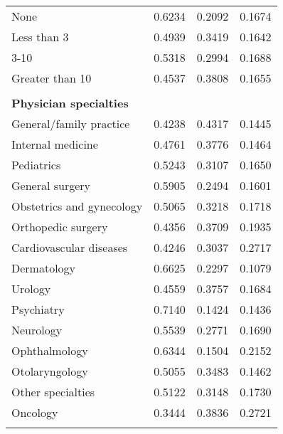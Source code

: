 \documentclass[11pt, oneside]{article}        %
\begin{document}
\begin{table}[h]
\begin{tabular}{llll}
None                                   & 0.6234 & 0.2092   & 0.1674   \\
Less than 3                            & 0.4939 & 0.3419   & 0.1642   \\
3-10                                   & 0.5318 & 0.2994   & 0.1688   \\
Greater than 10                        & 0.4537 & 0.3808   & 0.1655   \\
                                       &        &          &          \\
\textbf{Physician specialties}         &        &          &          \\
General/family practice                & 0.4238 & 0.4317   & 0.1445   \\
Internal medicine                      & 0.4761 & 0.3776   & 0.1464   \\
Pediatrics                             & 0.5243 & 0.3107   & 0.1650    \\
General surgery                        & 0.5905 & 0.2494   & 0.1601   \\
Obstetrics and gynecology              & 0.5065 & 0.3218   & 0.1718   \\
Orthopedic surgery                     & 0.4356 & 0.3709   & 0.1935   \\
Cardiovascular diseases                & 0.4246 & 0.3037   & 0.2717   \\
Dermatology                            & 0.6625 & 0.2297   & 0.1079   \\
Urology                                & 0.4559 & 0.3757   & 0.1684   \\
Psychiatry                             & 0.7140  & 0.1424   & 0.1436   \\
Neurology                              & 0.5539 & 0.2771   & 0.1690    \\
Ophthalmology                          & 0.6344 & 0.1504   & 0.2152   \\
Otolaryngology                         & 0.5055 & 0.3483   & 0.1462   \\
Other specialties                      & 0.5122 & 0.3148   & 0.1730    \\
Oncology                               & 0.3444 & 0.3836   & 0.2721   \\
                                       &        &          &          \\


\end{tabular}
\end{table}
\end{document}
